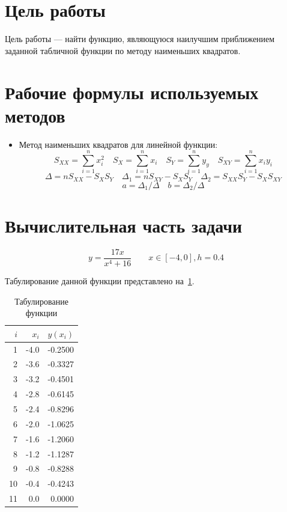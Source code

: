 \section{Цель работы}
Цель работы --- найти функцию, являющуюся наилучшим приближением заданной табличной функции по методу наименьших квадратов.
\section{Рабочие формулы используемых методов}
\begin{itemize}
	\item Метод наименьших квадратов для линейной функции:
	      \[
		      S_{XX} = \sum_{i=1}^n x_i^2
		      \quad
		      S_X = \sum_{i=1}^n x_i
		      \quad
		      S_Y = \sum_{i=1}^n y_y
		      \quad
		      S_{XY} = \sum_{i=1}^n x_i y_i
	      \]
	      \[
		      \Delta = n S_{XX} - S_X S_Y
		      \quad
		      \Delta_1 = n S_{XY} - S_X S_Y
		      \quad
		      \Delta_2 = S_{XX} S_Y - S_X S_{XY}
	      \]
	      \[
		      a = \Delta_1 / \Delta
		      \quad
		      b = \Delta_2 / \Delta
	      \]
\end{itemize}

\section{Вычислительная часть задачи}
\[
	y = \frac{17 x}{x^4 + 16}
	\qquad
	x \in [-4, 0], h = 0.4
\]

Табулирование данной функции представлено на~\cref{table:func_tabling}.

\begin{table}
  \caption{Табулирование функции}\label{table:func_tabling}
	\centering
	\begin{tabular}{rrr}
		\toprule
		\(i\) & \(x_i\) & \(y(x_i)\) \\
		\midrule
		1     & -4.0    & -0.2500    \\
		2     & -3.6    & -0.3327    \\
		3     & -3.2    & -0.4501    \\
		4     & -2.8    & -0.6145    \\
		5     & -2.4    & -0.8296    \\
		6     & -2.0    & -1.0625    \\
		7     & -1.6    & -1.2060    \\
		8     & -1.2    & -1.1287    \\
		9     & -0.8    & -0.8288    \\
		10    & -0.4    & -0.4243    \\
		11    & 0.0     & 0.0000     \\
		\bottomrule
	\end{tabular}
\end{table}

